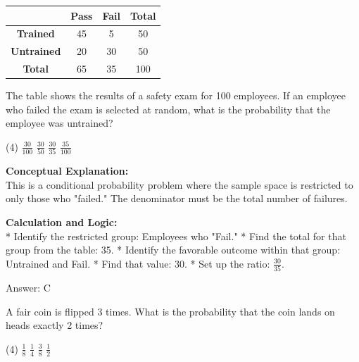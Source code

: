 \documentclass[11pt,paper=a4,answers]{exam}
\begin{document}
\begin{questions}
\question
\begin{center}
\begin{tabular}{|c|c|c|c|}
\hline
 & \textbf{Pass} & \textbf{Fail} & \textbf{Total} \\ \hline
\textbf{Trained} & 45 & 5 & 50 \\ \hline
\textbf{Untrained} & 20 & 30 & 50 \\ \hline
\textbf{Total} & 65 & 35 & 100 \\ \hline
\end{tabular}
\end{center}
The table shows the results of a safety exam for 100 employees. If an employee who failed the exam is selected at random, what is the probability that the employee was untrained?
\begin{tasks}(4)
    \task $\frac{30}{100}$
    \task $\frac{30}{50}$
    \task $\frac{30}{35}$
    \task $\frac{35}{100}$
\end{tasks}

\begin{solution}
\textbf{Conceptual Explanation:} \\
This is a conditional probability problem where the sample space is restricted to only those who "failed." The denominator must be the total number of failures.

\vspace{30pt}

\textbf{Calculation and Logic:} \\
* Identify the restricted group: Employees who "Fail."
* Find the total for that group from the table: 35.
* Identify the favorable outcome within that group: Untrained and Fail.
* Find that value: 30.
* Set up the ratio: $\frac{30}{35}$.

\vspace{30pt}

Answer: \colorbox{yellow!100}{C}
\end{solution}

\vspace{60pt}

\question
A fair coin is flipped 3 times. What is the probability that the coin lands on heads exactly 2 times?
\begin{tasks}(4)
    \task $\frac{1}{8}$
    \task $\frac{1}{4}$
    \task $\frac{3}{8}$
    \task $\frac{1}{2}$
\end{tasks}


\end{questions}
\end{document}
